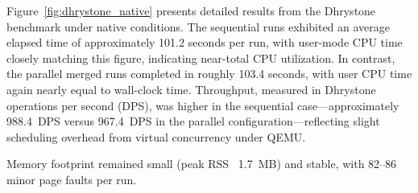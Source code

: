 
Figure~\ref{fig:dhrystone_native} presents detailed results from the Dhrystone benchmark under native conditions. The sequential runs exhibited an average elapsed time of approximately 101.2 seconds per run, with user-mode CPU time closely matching this figure, indicating near-total CPU utilization. In contrast, the parallel merged runs completed in roughly 103.4 seconds, with user CPU time again nearly equal to wall-clock time. Throughput, measured in Dhrystone operations per second (DPS), was higher in the sequential case—approximately 988.4~DPS versus 967.4~DPS in the parallel configuration—reflecting slight scheduling overhead from virtual concurrency under QEMU.




Memory footprint remained small (peak RSS ~1.7~MB) and stable, with 82--86 minor page faults per run.


